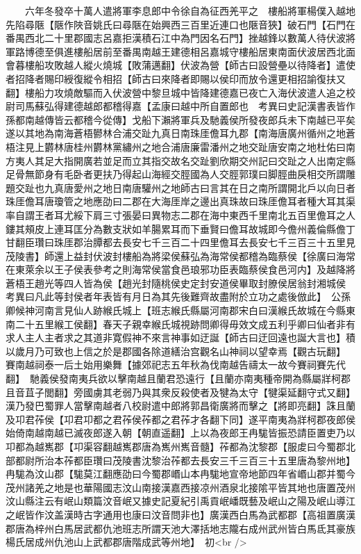 　　六年冬發卒十萬人遣將軍李息郎中令徐自為征西羌平之　樓船將軍楊僕入越地先陷尋陿【陿作陜音姚氏曰尋陿在始興西三百里近連口也陿音狹】破石門【石門在番禺西北二十里郡國志呂嘉拒漢積石江中為門因名石門】挫越鋒以數萬人待伏波將軍路博德至俱進樓船居前至番禺南越王建德相呂嘉城守樓船居東南面伏波居西北面會暮樓船攻敗越人縱火燒城【敗蒲邁翻】伏波為營【師古曰設營壘以待降者】遣使者招降者賜印綬復縱令相招【師古曰來降者即賜以侯印而放令還更相招諭復扶又翻】樓船力攻燒敵驅而入伏波營中黎旦城中皆降建德嘉已夜亡入海伏波遣人追之校尉司馬蘇弘得建德越郎都稽得嘉【孟康曰越中所自置郎也　考異曰史記漢書表皆作孫都南越傳皆云都稽今從傳】戈船下瀨將軍兵及馳義侯所發夜郎兵未下南越已平矣遂以其地為南海蒼梧鬰林合浦交趾九真日南珠厓儋耳九郡【南海唐廣州循州之地蒼梧注見上欝林唐桂州欝林黨繡州之地合浦唐廉雷潘州之地交趾唐安南之地杜佑曰南方夷人其足大指開廣若並足而立其指交故名交趾劉欣期交州記曰交趾之人出南定縣足骨無節身有毛卧者更扶乃得起山海經交脛國為人交脛郭璞曰脚脛曲戾相交所謂雕題交趾也九真唐愛州之地日南唐驩州之地師古曰言其在日之南所謂開北戶以向日者珠厓儋耳唐瓊管之地應劭曰二郡在大海厓岸之邊出真珠故曰珠厓儋耳者種大耳其渠率自謂王者耳尤綏下肩三寸張晏曰異物志二郡在海中東西千里南北五百里儋耳之人鏤其頰皮上連耳匡分為數支狀如羊腸累耳而下垂賢曰儋耳故城即今儋州義倫縣儋丁甘翻臣瓚曰珠厓郡治䐺都去長安七千三百二十四里儋耳去長安七千三百三十五里見茂陵書】師還上益封伏波封樓船為將梁侯蘇弘為海常侯都稽為臨蔡侯【徐廣曰海常在東萊余以王子侯表參考之則海常侯當食邑琅邪功臣表臨蔡侯食邑河内】及越降將蒼梧王趙光等四人皆為侯【趙光封隨桃侯史定封安道侯畢取封膫侯居翁封湘城侯　考異曰凡此等封侯者年表皆有月日為其先後難齊故盡附於立功之處後倣此】　公孫卿候神河南言見仙人跡緱氏城上【班志緱氏縣屬河南郡宋白曰漢緱氏故城在今縣東南二十五里緱工侯翻】春天子親幸緱氏城視跡問卿得毋效文成五利乎卿曰仙者非有求人主人主者求之其道非寛假神不來言神事如迂誕【師古曰迂回遠也誕大言也】積以歲月乃可致也上信之於是郡國各除道繕治宫觀名山神祠以望幸焉【觀古玩翻】　賽南越祠泰一后土始用樂舞【據郊祀志五年秋為伐南越告禱太一故今賽祠賽先代翻】　馳義侯發南夷兵欲以擊南越且蘭君恐遠行【且蘭亦南夷種帝開為縣屬牂柯郡且音苴子閭翻】旁國虜其老弱乃與其衆反殺使者及犍為太守【犍渠延翻守式又翻】漢乃發巴蜀罪人當擊南越者八校尉遣中郎將郭昌衛廣將而擊之【將即亮翻】誅且蘭及卭君莋侯【卭君卭都之君莋侯莋都之君莋才各翻下同】遂平南夷為牂柯郡夜郎侯始倚南越南越已滅夜郎遂入朝【朝直遥翻】上以為夜郎王冉駹皆振恐請臣置吏乃以卭都為越嶲郡【卭渠容翻越嶲郡唐為嶲州嶲音髓】莋都為沈黎郡【服䖍曰今蜀郡北部都尉所治本莋都臣瓚曰茂陵書沈黎治莋都去長安三千三百三十五里唐為黎州地】冉駹為汶山郡【駹莫江翻應劭曰今蜀郡㟭山本冉駹地宣帝地節四年省㟭山郡并蜀今茂州諸羌之地是也華陽國志汶山南接漢嘉西接凉州酒泉北接隂平皆其地也唐置茂州汶山縣注云有岷山類篇汶音岷又據史記夏紀引禹貢岷嶓既藝及岷山之陽及岷山導江之岷皆作汶盖漢時古字通用也康曰汶音問非也】廣漢西白馬為武都郡【高祖置廣漢郡唐為梓州白馬居武都仇池班志所謂天池大澤括地志隴右成州武州皆白馬氐其豪族楊氏居成州仇池山上武都郡唐階成武等州地】　初<br />

